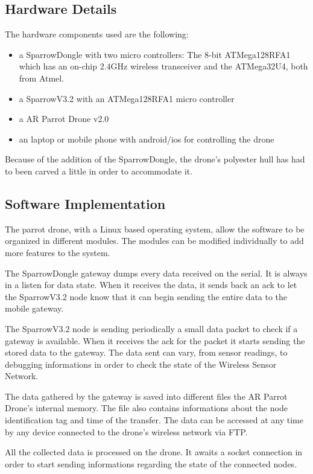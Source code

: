 \label{chap:impl}

 \subsection{Hardware Details}

The hardware components used are the following:
\begin{itemize}

\item a SparrowDongle with two micro controllers: The 8-bit ATMega128RFA1 which has an on-chip 2.4GHz wireless transceiver and the ATMega32U4, both from Atmel.

\item a SparrowV3.2  with an ATMega128RFA1 micro controller 

\item a AR Parrot Drone v2.0

\item an laptop or mobile phone with android/ios for controlling the drone

\end{itemize}

Because of the addition of the SparrowDongle, the drone's polyester hull has had to been carved a little in order to accommodate it.
 

\subsection{Software Implementation}

The parrot drone, with a Linux based operating system, allow the software to be organized in different modules. The modules can be modified individually  to add more features to the system.

The SparrowDongle gateway dumps every data received on the serial. It is always in a listen for data state. When it receives the data, it sends back an ack to let the SparrowV3.2 node know that it can begin sending the entire data to the mobile gateway. 

The SparrowV3.2 node is sending periodically a small data packet to check if a gateway is available. When it receives the ack for the packet it starts sending the stored data to the gateway. The data sent can vary, from sensor readings, to debugging informations in order to check the state of the Wireless Sensor Network.

The data gathered by the gateway is saved into different files the AR Parrot Drone's internal memory. The file also contains informations about the node identification tag and time of the transfer. The data can be accessed at any time by any device connected to the drone's wireless network via FTP.

All the collected data is processed on the drone. It awaits a socket connection in order to start sending informations regarding the state of the connected nodes.

